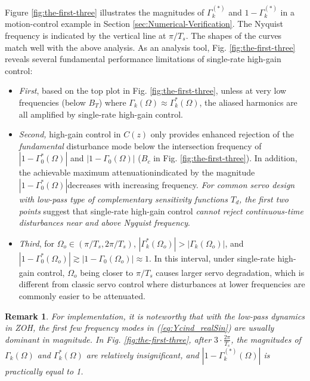 \documentclass [11pt, proquest] {uwthesis}[2020/02/24]
\newtheorem{remark}{Remark}
\begin{document}
Figure \ref{fig:the-first-three} illustrates the magnitudes of $\Gamma_{k}^{(*)}$
and $1-\Gamma_{k}^{(*)}$ in a motion-control example in Section \ref{sec:Numerical-Verification}.
The Nyquist frequency is indicated by the vertical line at $\pi/T_{s}$.
The shapes of the curves match well with the above analysis. As an
analysis tool, Fig. \ref{fig:the-first-three} reveals several fundamental
performance limitations of single-rate high-gain control:
\begin{itemize}
\item \emph{First}, based on the top plot in Fig. \ref{fig:the-first-three},
unless at very low frequencies (below $B_{T}$) where $\Gamma_{k}(\Omega)\approx\Gamma_{k}^{*}(\Omega)$,
the aliased harmonics are all amplified by single-rate high-gain control.
\item \textit{Second}\textit{\emph{, }}high-gain control in $C(z)$ only
provides enhanced rejection of the \emph{fundamental} disturbance
mode below the intersection frequency of $|1-\Gamma_{0}^{*}(\Omega)|$
and $|1-\Gamma_{0}(\Omega)|$ ($B_{c}$ in Fig. \ref{fig:the-first-three}).
In addition, the achievable maximum attenuation\textemdash indicated
by the magnitude $|1-\Gamma_{0}^{*}(\Omega)|$\textemdash decreases
with increasing frequency. \textit{\emph{For common servo design with
low-pass type of complementary sensitivity functions $T_{d}$, the
first two points }}suggest that single-rate high-gain control\emph{
cannot reject continuous-time disturbances near and above Nyquist
frequency}.
\item \emph{Third}, for $\Omega_{o}\in(\pi/T_{s},2\pi/T_{s})$, $|\Gamma_{k}^{*}(\Omega_{o})|>|\Gamma_{k}(\Omega_{o})|$,
and $|1-\Gamma_{0}^{*}(\Omega_{o})|\gtrsim|1-\Gamma_{0}(\Omega_{o})|\approx1$.
In this interval, under single-rate high-gain control, $\Omega_{o}$
being closer to $\pi/T_{s}$ causes larger servo degradation, which
is different from classic servo control where disturbances at lower
frequencies are commonly easier to be attenuated.
\end{itemize}
\begin{remark}For implementation, it is noteworthy that with the
low-pass dynamics in ZOH, the first few frequency modes in (\ref{eq:Ycind_realSin})
are usually dominant in magnitude. In Fig. \ref{fig:the-first-three},
after $3\cdot\frac{2\pi}{T_{s}}$, the magnitudes of $\Gamma_{k}(\Omega)$
and $\Gamma_{k}^{*}(\Omega)$ are relatively insignificant, and $\left|1-\Gamma_{k}^{(*)}(\Omega)\right|$
is practically equal to 1.\end{remark}
\end{document}
